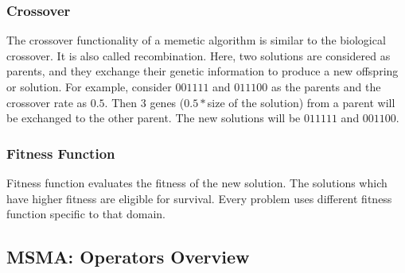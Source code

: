 \documentclass[fleqn,usenatbib]{mnras}
\begin{document}
\subsubsection{Crossover}
The crossover functionality of a memetic algorithm is similar to the biological crossover. It is also called recombination. Here, two solutions are considered as parents, and they exchange their genetic information to produce a new offspring or solution.
For example, consider $0 0 1 1 1 1$ and $0 1 1 1 0 0$ as the parents and the crossover rate as $0.5$. Then $3$ genes ($0.5 *$size of the solution) from a parent will be exchanged to the other parent. The new solutions will be $0 1 1 1 1 1$ and $0 0 1 1 0 0$.
\subsubsection{Fitness Function}
Fitness function evaluates the fitness of the new solution. The solutions which have higher fitness are eligible for survival. Every problem uses different fitness function specific to that domain.

\subsection{MSMA: Operators Overview}
\end{document}
